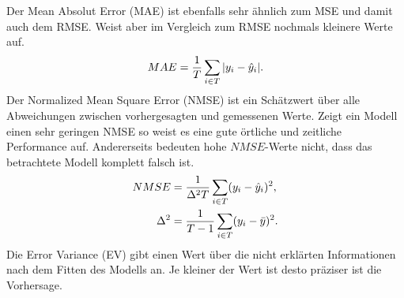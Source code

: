 %
Der Mean Absolut Error (\gls{MAE}) ist ebenfalls sehr ähnlich zum MSE und damit auch dem RMSE. Weist aber im Vergleich zum RMSE nochmals kleinere Werte auf.
\begin{equation}
MAE= \frac{1}{T} \sum\limits_{i \in T} \abs{y_i-\hat{y}_i}.
\label{gl:MAE}
\end{equation}
%
%
Der Normalized Mean Square Error (\gls{NMSE}) ist ein Schätzwert über alle Abweichungen zwischen vorhergesagten und gemessenen Werte. Zeigt ein Modell einen sehr geringen NMSE so weist es eine gute örtliche und zeitliche Performance auf. Andererseits bedeuten hohe $NMSE$-Werte nicht, dass das betrachtete Modell komplett falsch ist.
\begin{gather}
\begin{aligned}
NMSE &= \frac{1}{\Delta^2 T} \sum\limits_{i \in T} (y_i-\hat{y}_i)^2,\\ 
\Delta^2 &= \frac{1}{T-1} \sum\limits_{i \in T} (y_i-\bar{y})^2.\\
\end{aligned}
\label{gl:NMSE}
\end{gather}
%
%
Die Error Variance (\gls{EV}) gibt einen Wert über die nicht erklärten Informationen nach dem Fitten des Modells an. Je kleiner der Wert ist desto präziser ist die Vorhersage.\,

